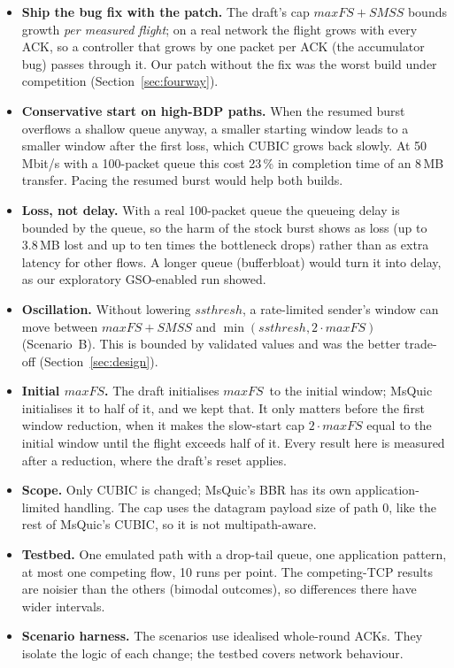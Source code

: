 \documentclass[11pt,a4paper]{article}
\newcommand{\maxfs}{\ensuremath{\mathit{maxFS}}}
\newcommand{\ssthresh}{\ensuremath{\mathit{ssthresh}}}
\newcommand{\smss}{\ensuremath{\mathit{SMSS}}}
\begin{document}
\begin{itemize}
  \item \textbf{Ship the bug fix with the patch.} The draft's cap
        $\maxfs + \smss$ bounds growth \emph{per measured flight}; on a real
        network the flight grows with every ACK, so a controller that grows by
        one packet per ACK (the accumulator bug) passes through it. Our patch
        without the fix was the worst build under competition
        (Section~\ref{sec:fourway}).
  \item \textbf{Conservative start on high-BDP paths.} When the resumed burst
        overflows a shallow queue anyway, a smaller starting window leads to a
        smaller window after the first loss, which CUBIC grows back slowly. At
        50\,Mbit/s with a 100-packet queue this cost 23\,\% in completion time of
        an 8\,MB transfer. Pacing the resumed burst would help both builds.
  \item \textbf{Loss, not delay.} With a real 100-packet queue the queueing
        delay is bounded by the queue, so the harm of the stock burst shows as
        loss (up to 3.8\,MB lost and up to ten times the bottleneck drops) rather than
        as extra latency for other flows. A longer queue (bufferbloat) would
        turn it into delay, as our exploratory GSO-enabled run showed.
  \item \textbf{Oscillation.} Without lowering \ssthresh, a rate-limited
        sender's window can move between $\maxfs + \smss$ and
        $\min(\ssthresh, 2\cdot\maxfs)$ (Scenario~B). This is bounded by
        validated values and was the better trade-off
        (Section~\ref{sec:design}).
  \item \textbf{Initial \maxfs.} The draft initialises \maxfs\ to the initial
        window; MsQuic initialises it to half of it, and we kept that. It only
        matters before the first window reduction, when it makes the
        slow-start cap $2\cdot\maxfs$ equal to the initial window until the
        flight exceeds half of it. Every result here is measured after a
        reduction, where the draft's reset applies.
  \item \textbf{Scope.} Only CUBIC is changed; MsQuic's BBR has its own
        application-limited handling. The cap uses the datagram payload size of
        path 0, like the rest of MsQuic's CUBIC, so it is not multipath-aware.
  \item \textbf{Testbed.} One emulated path with a drop-tail queue, one
        application pattern, at most one competing flow, 10 runs per point. The
        competing-TCP results are noisier than the others (bimodal outcomes),
        so differences there have wider intervals.
  \item \textbf{Scenario harness.} The scenarios use idealised whole-round ACKs.
        They isolate the logic of each change; the testbed covers network
        behaviour.
\end{itemize}
\end{document}
